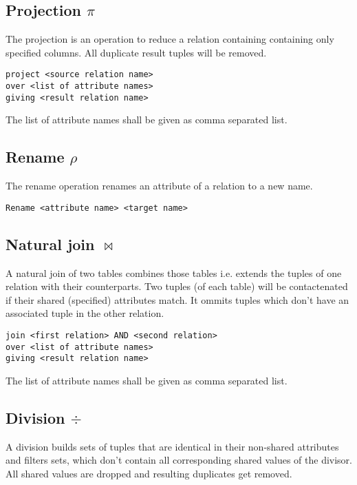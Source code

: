 \documentclass[a4paper,twocolumn]{article}
\begin{document}
\subsection{Projection $\pi$}

The projection is an operation to reduce a relation containing containing
only specified columns. All duplicate result tuples will be removed.

\begin{verbatim}
project <source relation name>
over <list of attribute names>
giving <result relation name>
\end{verbatim}

The list of attribute names shall be given as comma separated list.

\subsection{Rename $\rho$}

The rename operation renames an attribute of a relation to a new name.

\begin{verbatim}
Rename <attribute name> <target name>
\end{verbatim}

\subsection{Natural join $\bowtie$}

A natural join of two tables combines those tables i.e. extends the tuples of
one relation with their counterparts. Two tuples (of each table) will be
contactenated if their shared (specified) attributes match. It ommits tuples
which don't have an associated tuple in the other relation.

\begin{verbatim}
join <first relation> AND <second relation>
over <list of attribute names>
giving <result relation name>
\end{verbatim}

The list of attribute names shall be given as comma separated list.

\subsection{Division $\div$}

A division builds sets of tuples that are identical in their non-shared
attributes and filters sets, which don't contain all corresponding shared
values of the divisor. All shared values are dropped and resulting
duplicates get removed.
\end{document}
